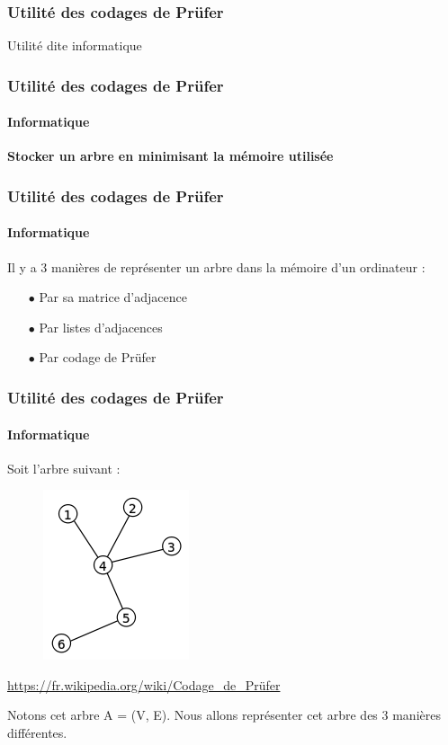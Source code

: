 \documentclass[11pt]{beamer}
\begin{document}
\begin{frame}
\frametitle{Utilité des codages de Prüfer}

\begin{center}
\LARGE{Utilité dite informatique}
\end{center}

\end{frame}

\begin{frame}
\frametitle{Utilité des codages de Prüfer}
\framesubtitle{Informatique}

\begin{center}
\textbf{Stocker un arbre en minimisant la mémoire utilisée}
\end{center}
\end{frame}

\begin{frame}
\frametitle{Utilité des codages de Prüfer}
\framesubtitle{Informatique}

Il y a 3 manières de représenter un arbre dans la mémoire d'un ordinateur :\\

\begin{enumerate}
\item[$\bullet$]Par sa matrice d'adjacence
\item[$\bullet$]Par listes d'adjacences
\item[$\bullet$]Par codage de Prüfer
\end{enumerate}
\end{frame}

\begin{frame}
\frametitle{Utilité des codages de Prüfer}
\framesubtitle{Informatique}

Soit l'arbre suivant :\\
\begin{figure}[!ht] \center
\includegraphics[scale=0.40]{exempleArbre.png}
\end{figure}
\begin{center}
\tiny{\url{https://fr.wikipedia.org/wiki/Codage_de_Prüfer}}
\end{center}

Notons cet arbre A = (V, E).
Nous allons représenter cet arbre des 3 manières différentes.
\end{frame}
\end{document}
